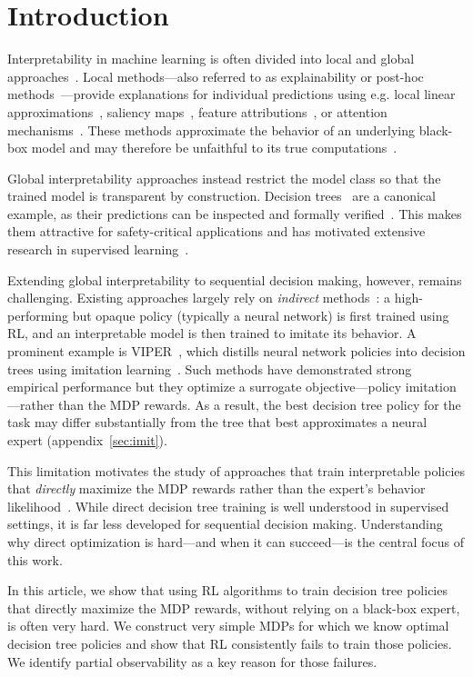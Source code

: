 \section{Introduction}
Interpretability in machine learning is often divided into local and global approaches~\citep{glanois-survey}.
Local methods—also referred to as explainability or post-hoc methods~\citep{lipton}—provide explanations for individual predictions using e.g. local linear approximations~\citep{lime}, saliency maps~\citep{Puri2020Explain}, feature attributions~\citep{shap}, or attention mechanisms~\citep{attention}.
These methods approximate the behavior of an underlying black-box model and may therefore be unfaithful to its true computations~\citep{Atrey2020Exploratory}.

Global interpretability approaches instead restrict the model class so that the trained model is transparent by construction.
Decision trees~\citep{breiman1984classification} are a canonical example, as their predictions can be inspected and formally verified~\citep{lipton}.
This makes them attractive for safety-critical applications and has motivated extensive research in supervised learning~\citep{lookahead,murtree,pystreed}.

Extending global interpretability to sequential decision making, however, remains challenging.
Existing approaches largely rely on \emph{indirect} methods~\citep{milani-survey}: a high-performing but opaque policy (typically a neural network) is first trained using RL, and an interpretable model is then trained to imitate its behavior.
A prominent example is VIPER~\citep{viper}, which distills neural network policies into decision trees using imitation learning~\citep{dagger}.
Such methods have demonstrated strong empirical performance but they optimize a surrogate objective—policy imitation—rather than the MDP rewards.
As a result, the best decision tree policy for the task may differ substantially from the tree that best approximates a neural expert (appendix~\ref{sec:imit}).

This limitation motivates the study of approaches that train interpretable policies that \textit{directly} maximize the MDP rewards rather than the expert's behavior likelihood~\citep{dagger}.
While direct decision tree training is well understood in supervised settings, it is far less developed for sequential decision making.
Understanding why direct optimization is hard—and when it can succeed—is the central focus of this work.

In this article, we show that using RL algorithms to train decision tree policies that directly maximize the MDP rewards, without relying on a black-box expert, is often very hard.
We construct very simple MDPs for which we know optimal decision tree policies and show that RL consistently fails to train those policies.
We identify partial observability as a key reason for those failures. 

